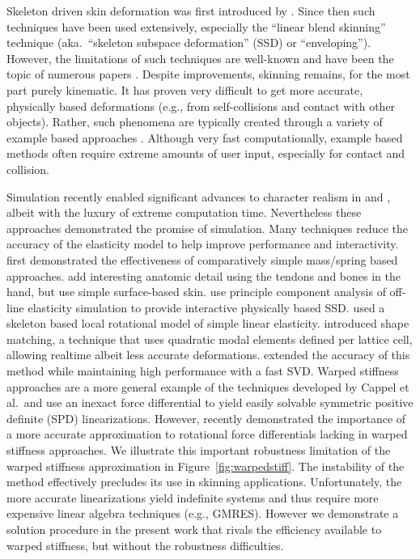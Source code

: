 %
Skeleton driven skin deformation was first introduced by \cite{Magnenat-Thalmann89}. Since then such techniques have been used extensively, especially the ``linear blend skinning'' technique (aka.\ ``skeleton subspace deformation'' (SSD) or ``enveloping''). However, the limitations of such techniques are well-known and have been the topic of numerous papers \cite{Wang02,Merry06,Kavan08}. Despite improvements, skinning remains, for the most part purely kinematic. It has proven very difficult to get more accurate, physically based deformations (e.g., from self-collisions and contact with other objects). Rather, such phenomena are typically created through a variety of example based approaches \cite{Lewis00,Sloan01}. Although very fast computationally, example based methods often require extreme amounts of user input, especially for contact and collision.

Simulation recently enabled significant advances to character realism in \cite{Irving:2008:SDF} and \cite{clutterbuck:2010:avatar}, albeit with the luxury of extreme computation time. Nevertheless these approaches demonstrated the promise of simulation. Many techniques reduce the accuracy of the elasticity model to help improve performance and interactivity. \cite{Waters90,Chadwick89} first demonstrated the effectiveness of comparatively simple mass/spring based approaches. \cite{Sueda:2008} add interesting anatomic detail using the tendons and bones in the hand, but use simple surface-based skin. \cite{Kry02} use principle component analysis of off-line elasticity simulation to provide interactive physically based SSD. \cite{capell:2005:pb,Capell:2002:ISD:566570.566622,Galopo07} used a skeleton based local rotational model of simple linear elasticity. \cite{Muller:2005:MDB} introduced shape matching, a technique that uses quadratic modal elements defined per lattice cell, allowing realtime albeit less accurate deformations. \cite{Rivers:2007:FFL} extended the accuracy of this
method while maintaining high performance with a fast SVD. Warped stiffness approaches \cite{Muller:2002:SRD,Muller:2004:IVM} are a more general example of the techniques developed by Cappel et al.\ and use an inexact force differential to yield easily solvable symmetric positive definite (SPD) linearizations. However, \cite{Chao:2010:SGM} recently demonstrated the importance of a more accurate approximation to rotational force differentials lacking in warped stiffness approaches. We  illustrate this important robustness limitation of the warped stiffness approximation in Figure~\ref{fig:warpedstiff}. The instability of the method effectively precludes its use in skinning applications. Unfortunately, the more accurate linearizations  yield indefinite systems and thus require more expensive linear algebra techniques (e.g., GMRES). However we demonstrate a solution procedure in the present work that rivals the efficiency available to warped stiffness, but without the robustness difficulties.

